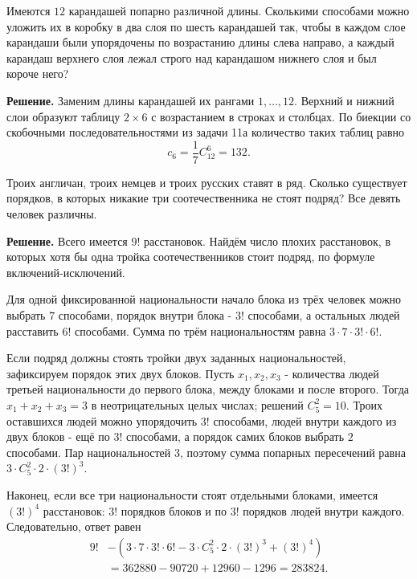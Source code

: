 \begin{problems}
\item Имеются $12$ карандашей попарно различной длины. Сколькими способами можно уложить их в коробку в два слоя по шесть карандашей так, чтобы в каждом слое карандаши были упорядочены по возрастанию длины слева направо, а каждый карандаш верхнего слоя лежал строго над карандашом нижнего слоя и был короче него?
\par\smallskip\noindent\textbf{Решение.} Заменим длины карандашей их рангами $1,\ldots,12$. Верхний и нижний слои образуют таблицу $2\times6$ с возрастанием в строках и столбцах. По биекции со скобочными последовательностями из задачи 11а количество таких таблиц равно
\[
c_6=\frac{1}{7}C_{12}^6=132.
\]\par

\item Троих англичан, троих немцев и троих русских ставят в ряд. Сколько существует порядков, в которых никакие три соотечественника не стоят подряд? Все девять человек различны.
\par\smallskip\noindent\textbf{Решение.} Всего имеется $9!$ расстановок. Найдём число плохих расстановок, в которых хотя бы одна тройка соотечественников стоит подряд, по формуле включений-исключений.
\par Для одной фиксированной национальности начало блока из трёх человек можно выбрать $7$ способами, порядок внутри блока - $3!$ способами, а остальных людей расставить $6!$ способами. Сумма по трём национальностям равна $3\cdot7\cdot3!\cdot6!$.
\par Если подряд должны стоять тройки двух заданных национальностей, зафиксируем порядок этих двух блоков. Пусть $x_1,x_2,x_3$ - количества людей третьей национальности до первого блока, между блоками и после второго. Тогда $x_1+x_2+x_3=3$ в неотрицательных целых числах; решений $C_5^2=10$. Троих оставшихся людей можно упорядочить $3!$ способами, людей внутри каждого из двух блоков - ещё по $3!$ способами, а порядок самих блоков выбрать $2$ способами. Пар национальностей $3$, поэтому сумма попарных пересечений равна $3\cdot C_5^2\cdot2\cdot(3!)^3$.
\par Наконец, если все три национальности стоят отдельными блоками, имеется $(3!)^4$ расстановок: $3!$ порядков блоков и по $3!$ порядков людей внутри каждого. Следовательно, ответ равен
\[
\begin{aligned}
9!&-\left(3\cdot7\cdot3!\cdot6!
-3\cdot C_5^2\cdot2\cdot(3!)^3+(3!)^4\right)\\
&=362880-90720+12960-1296=283824.
\end{aligned}
\]\par


\end{problems}

